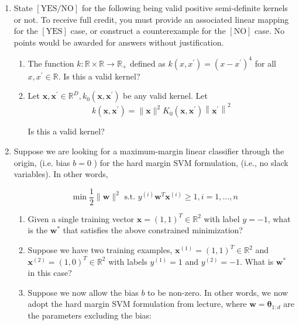 \documentclass[letterpaper]{article}
\theoremstyle{definition}
\begin{document}
\begin{enumerate}
\item State \([\mathrm{YES} / \mathrm{NO}]\) for the following being valid
positive semi-definite kernels or not. To receive full credit, you
must provide an associated linear mapping for the \([\mathrm{YES}]\)
case, or construct a counterexample for the \([\mathrm{NO}]\) case.
No points would be awarded for answers without justification.

\begin{enumerate}
\item The function \(k: \mathbb{R} \times \mathbb{R} \rightarrow
      \mathbb{R}_{+}\) defined as \(k\left(x,
      x^{\prime}\right)=\left(x-x^{\prime}\right)^{4}\) for all \(x,
      x^{\prime} \in \mathbb{R}\). Is this a valid kernel?

\item Let \(\mathbf{x}, \mathbf{x}^{\prime} \in \mathbb{R}^{D},
      k_{0}\left(\mathbf{x}, \mathbf{x}^{\prime}\right)\) be any valid
kernel. Let $$k\left(\mathbf{x},
      \mathbf{x}^{\prime}\right)=\|\mathbf{x}\|^{2}
      K_{0}\left(\mathbf{x},
      \mathbf{x}^{\prime}\right)\left\|\mathbf{x}^{\prime}\right\|^{2}$$

Is this a valid kernel?
\end{enumerate}

\item Suppose we are looking for a maximum-margin linear classifier
through the origin, (i.e. bias \(b=0\) ) for the hard margin SVM
formulation, (i.e., no slack variables). In other words,

$$\min \frac{1}{2}\|\mathbf{w}\|^{2} \text { s.t. } y^{(i)}
   \mathbf{w}^{T} \mathbf{x}^{(i)} \geq 1, i=1, \ldots, n$$

\begin{enumerate}
\item Given a single training vector \(\mathbf{x}=(1,1)^{T} \in
      \mathbb{R}^{2}\) with label \(y=-1\), what is the \(\mathbf{w}^{*}\)
that satisfies the above constrained minimization?

\item Suppose we have two training examples,
\(\mathbf{x}^{(1)}=(1,1)^{T} \in \mathbb{R}^{2}\) and
\(\mathbf{x}^{(2)}=(1,0)^{T} \in \mathbb{R}^{2}\) with labels
\(y^{(1)}=1\) and \(y^{(2)}=-1\). What is \(\mathbf{w}^{*}\) in this
case?

\item Suppose we now allow the bias \(b\) to be non-zero. In other
words, we now adopt the hard margin SVM formulation from
lecture, where \(\mathbf{w}=\boldsymbol{\theta}_{1: d}\) are the
parameters excluding the bias:


\end{enumerate}
\end{enumerate}
\end{document}

